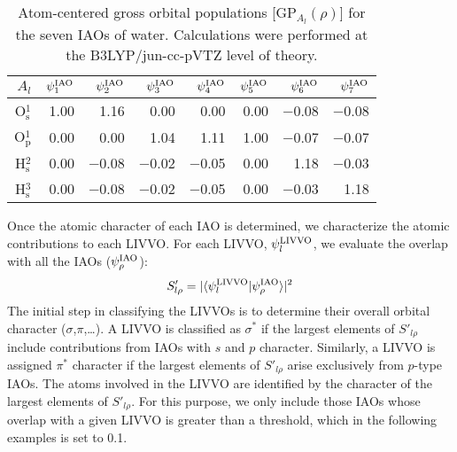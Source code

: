 \documentclass{article}
\begin{document}
\begin{table}[b]
\renewcommand{\arraystretch}{1.2}
\footnotesize
\centering
\caption{Atom-centered gross orbital populations [GP$_{A_l}(\rho)$] for the seven IAOs of water. Calculations were performed at the B3LYP/jun-cc-pVTZ level of theory.}
\begin{tabular}{r@{\hskip6pt}r@{\hskip6pt}r@{\hskip6pt}r@{\hskip6pt}r@{\hskip6pt}r@{\hskip6pt}r@{\hskip6pt}r}
\toprule
$A_{l}$ & $\psi^{\rm IAO}_1$ & $\psi^{\rm IAO}_2$ & $\psi^{\rm IAO}_3$ & $\psi^{\rm IAO}_4$& $\psi^{\rm IAO}_5$& $\psi^{\rm IAO}_6$& $\psi^{\rm IAO}_7$ \\[3pt]
\midrule
O$_\mathrm{s}^1$ & 1.00 & 1.16 & 0.00 & 0.00 & 0.00 & $-$0.08 & $-$0.08 \\
O$_\mathrm{p}^1$ & 0.00 & 0.00 & 1.04 & 1.11 & 1.00 & $-$0.07 & $-$0.07 \\
H$^2_\mathrm{s}$ &0.00 & $-$0.08 & $-$0.02 & $-$0.05 & 0.00 & 1.18&  $-$0.03\\
H$^3_\mathrm{s}$ & 0.00 & $-$0.08 & $-$0.02 & $-$0.05 & 0.00 & $-$0.03 & 1.18\\
\bottomrule
\end{tabular}
\label{tab:iao_atomic}
\end{table}
\setlength{\tabcolsep}{0.1em}

Once the atomic character of each IAO is determined, we characterize the atomic contributions to each LIVVO.
For each LIVVO, $\psi_l^{\rm LIVVO}$, we evaluate the overlap with all the IAOs ($\psi^{\rm IAO}_{\rho}$):
\begin{equation}
\label{eq:livvo_iao_overlap}
S'_{l \rho} = | \langle \psi_l^{\rm LIVVO} | \psi^{\rm IAO}_{\rho} \rangle |^2
\end{equation}
The initial step in classifying the LIVVOs is to determine their overall orbital character ($\sigma$,$\pi$,\ldots).
A LIVVO is classified as $\sigma^*$ if the largest elements of $S'_{l \rho}$ include contributions from IAOs with $s$ and $p$ character.
Similarly, a LIVVO is assigned $\pi^*$ character if the largest elements of $S'_{l \rho}$ arise exclusively from $p$-type IAOs.
The atoms involved in the LIVVO are identified by the character of the  largest elements of $S'_{l \rho}$.
For this purpose, we only include those IAOs whose overlap with a given LIVVO is greater than a threshold, which in the following examples is set to 0.1.
\end{document}
